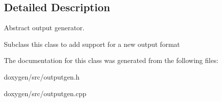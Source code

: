 \subsection{Detailed Description}
Abstract output generator.

Subclass this class to add support for a new output format 

The documentation for this class was generated from the following files\+:\begin{DoxyCompactItemize}
\item 
doxygen/src/outputgen.\+h\item 
doxygen/src/outputgen.\+cpp\end{DoxyCompactItemize}

